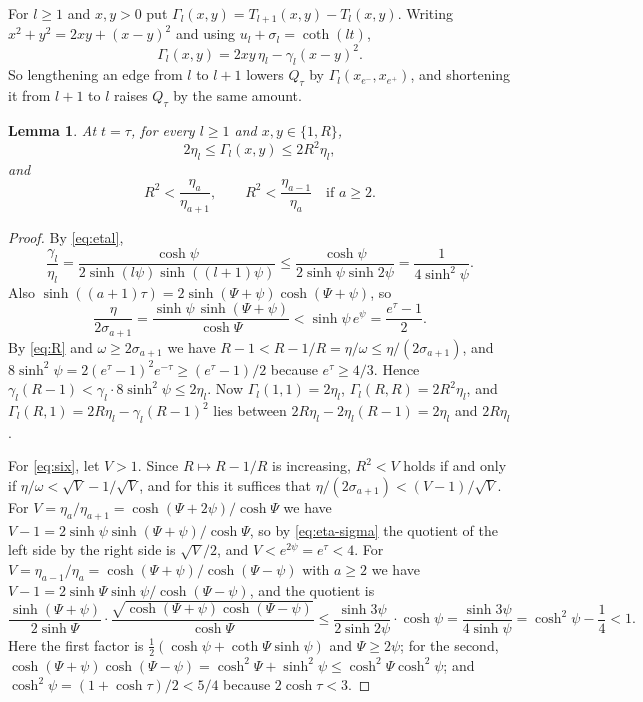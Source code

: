 \documentclass[11pt]{article}
\newtheorem{lemma}[theorem]{Lemma}
\theoremstyle{definition}
\theoremstyle{remark}
\begin{document}
For $l\ge1$ and $x,y>0$ put $\Gamma_l(x,y)=T_{l+1}(x,y)-T_l(x,y)$. Writing $x^2+y^2=2xy+(x-y)^2$ and using
$u_l+\sigma_l=\coth(lt)$,
\begin{equation}\label{eq:Gamma}
\Gamma_l(x,y)=2xy\,\eta_l-\gamma_l(x-y)^2 .
\end{equation}
So lengthening an edge from $l$ to $l+1$ lowers $Q_\tau$ by $\Gamma_l(x_{e^-},x_{e^+})$, and shortening it from $l+1$ to
$l$ raises $Q_\tau$ by the same amount.

\begin{lemma}\label{lem:Gamma}
At $t=\tau$, for every $l\ge1$ and $x,y\in\{1,R\}$,
\[
2\eta_l\le\Gamma_l(x,y)\le2R^2\eta_l,
\]
and
\begin{equation}\label{eq:six}
R^2<\frac{\eta_a}{\eta_{a+1}},\qquad R^2<\frac{\eta_{a-1}}{\eta_a}\quad\text{if }a\ge2 .
\end{equation}
\end{lemma}

\begin{proof}
By \eqref{eq:etal},
\[
\frac{\gamma_l}{\eta_l}=\frac{\cosh\psi}{2\sinh(l\psi)\sinh((l+1)\psi)}\le\frac{\cosh\psi}{2\sinh\psi\sinh2\psi}=\frac1{4\sinh^2\psi}.
\]
Also $\sinh((a+1)\tau)=2\sinh(\Psi+\psi)\cosh(\Psi+\psi)$, so
\begin{equation}\label{eq:eta-sigma}
\frac{\eta}{2\sigma_{a+1}}=\frac{\sinh\psi\,\sinh(\Psi+\psi)}{\cosh\Psi}<\sinh\psi\,e^{\psi}=\frac{e^\tau-1}{2}.
\end{equation}
By \eqref{eq:R} and $\omega\ge2\sigma_{a+1}$ we have $R-1<R-1/R=\eta/\omega\le\eta/(2\sigma_{a+1})$, and
$8\sinh^2\psi=2(e^\tau-1)^2e^{-\tau}\ge(e^\tau-1)/2$ because $e^\tau\ge4/3$. Hence $\gamma_l(R-1)<\gamma_l\cdot8\sinh^2\psi\le2\eta_l$. Now
$\Gamma_l(1,1)=2\eta_l$, $\Gamma_l(R,R)=2R^2\eta_l$, and
$\Gamma_l(R,1)=2R\eta_l-\gamma_l(R-1)^2$ lies between $2R\eta_l-2\eta_l(R-1)=2\eta_l$ and $2R\eta_l$.

For \eqref{eq:six}, let $V>1$. Since $R\mapsto R-1/R$ is increasing, $R^2<V$ holds if and only if
$\eta/\omega<\sqrt V-1/\sqrt V$, and for this it suffices that $\eta/(2\sigma_{a+1})<(V-1)/\sqrt V$. For
$V=\eta_a/\eta_{a+1}=\cosh(\Psi+2\psi)/\cosh\Psi$ we have $V-1=2\sinh\psi\sinh(\Psi+\psi)/\cosh\Psi$, so by
\eqref{eq:eta-sigma} the quotient of the left side by the right side is $\sqrt V/2$, and $V<e^{2\psi}=e^\tau<4$. For
$V=\eta_{a-1}/\eta_a=\cosh(\Psi+\psi)/\cosh(\Psi-\psi)$ with $a\ge2$ we have $V-1=2\sinh\Psi\sinh\psi/\cosh(\Psi-\psi)$,
and the quotient is
\[
\frac{\sinh(\Psi+\psi)}{2\sinh\Psi}\cdot\frac{\sqrt{\cosh(\Psi+\psi)\cosh(\Psi-\psi)}}{\cosh\Psi}
\le\frac{\sinh3\psi}{2\sinh2\psi}\cdot\cosh\psi=\frac{\sinh3\psi}{4\sinh\psi}=\cosh^2\psi-\frac14<1 .
\]
Here the first factor is $\frac12(\cosh\psi+\coth\Psi\sinh\psi)$ and $\Psi\ge2\psi$; for the second,
$\cosh(\Psi+\psi)\cosh(\Psi-\psi)=\cosh^2\Psi+\sinh^2\psi\le\cosh^2\Psi\cosh^2\psi$; and $\cosh^2\psi=(1+\cosh\tau)/2<5/4$
because $2\cosh\tau<3$.
\end{proof}
\end{document}
